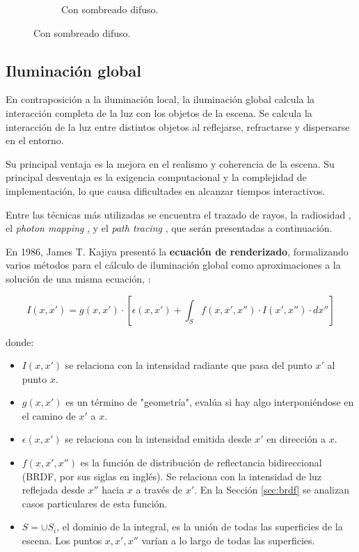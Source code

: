 \begin{figure}[h!]
\begin{center}
\begin{subfigure}{.49\textwidth}
        \caption{Con sombreado difuso.}
    \end{subfigure}
    \label{fig:sphere-blinn-phong}
    \end{center}
\end{figure}

\subsection{Iluminación global}

En contraposición a la iluminación local, la iluminación global calcula la interacción completa de la luz con los objetos de la escena.
Se calcula la interacción de la luz entre distintos objetos al reflejarse, refractarse y dispersarse en el entorno.

Su principal ventaja es la mejora en el realismo y coherencia de la escena.
Su principal desventaja es la exigencia computacional y la complejidad de implementación, lo que causa dificultades en alcanzar tiempos interactivos.

Entre las técnicas más utilizadas se encuentra el trazado de rayos, la radiosidad \cite[p.~442]{rtr}, el \textit{photon mapping} \cite{photon-mapping}, y el \textit{path tracing} \cite{rendering-equation}, que serán presentadas a continuación.

En 1986, James T. Kajiya presentó la \textbf{ecuación de renderizado}, formalizando varios métodos para el cálculo de iluminación global como aproximaciones a la solución de una misma ecuación, \cite{rendering-equation}:

\begin{equation}\label{eq:rendering-equation}
    I(x, x') = g(x, x') \cdot \left[\epsilon(x, x') + \int_S f(x, x', x'') \cdot I(x', x'') \cdot dx'' \right]
\end{equation}

donde:
\begin{itemize}
    \item $I(x, x')$ se relaciona con la intensidad radiante que pasa del punto $x'$ al punto $x$.
    \item $g(x, x')$ es un término de "geometría", evalúa si hay algo interponiéndose en el camino de $x'$ a $x$.
    \item $\epsilon(x, x')$ se relaciona con la intensidad emitida desde $x'$ en dirección a $x$.
    \item $f(x, x', x'')$ es la función de distribución de reflectancia bidireccional (BRDF, por sus siglas en inglés). Se relaciona con la intensidad de luz reflejada desde $x''$ hacia $x$ a través de $x'$. En la Sección \ref{sec:brdf} se analizan casos particulares de esta función.
    \item $S = \cup{S_i}$, el dominio de la integral, es la unión de todas las superficies de la escena. Los puntos $x, x', x''$ varían a lo largo de todas las superficies.
\end{itemize}

